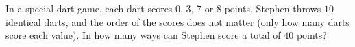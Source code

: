 In a special dart game, each dart scores $0$, $3$, $7$ or $8$ points. Stephen throws $10$ identical darts, and the order of the scores does not matter (only how many darts score each value). In how many ways can Stephen score a total of $40$ points?
